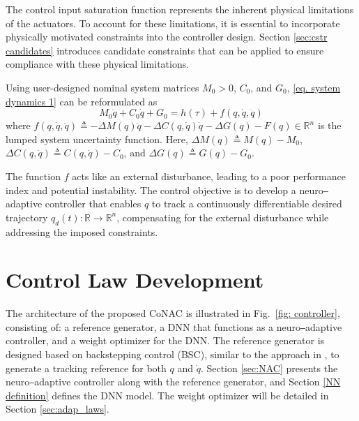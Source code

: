 \documentclass[lettersize,journal]{IEEEtran}
\begin{document}
The control input saturation function represents the inherent physical limitations of the actuators. To account for these limitations, it is essential to incorporate physically motivated constraints into the controller design. Section \ref{sec:cstr candidates} introduces candidate constraints that can be applied to ensure compliance with these physical limitations.

Using user-designed nominal system matrices $M_0 > 0$, $C_0$, and $G_0$, \eqref{eq. system dynamics 1} can be reformulated as
\begin{equation}
    M_0\ddot q+C_0\dot q+G_0 = h(\tau) + f(q,\dot q,\ddot q)
    \label{eq. system dynamics 2}
\end{equation}
where $f(q,\dot q,\ddot q) \triangleq -\Delta M(q)\ddot q-\Delta C(q,\dot q)\dot q -\Delta G(q) -F(q)\in\mathbb{R}^n$ is the lumped system uncertainty function. Here, $\Delta M(q)\triangleq M(q)-M_0$, $\Delta C(q,\dot q)\triangleq C(q,\dot q)-C_0$, and $\Delta G(q)\triangleq G(q)-G_0$. 

The function $f$ acts like an external disturbance, leading to a poor performance index and potential instability. 
The control objective is to develop a neuro‒adaptive controller that enables $q$ to track a continuously differentiable desired trajectory ${q_d}(t): \mathbb{R} \to \mathbb{R}^n$, compensating for the external disturbance while addressing the imposed constraints.

\section{Control Law Development}\label{sec:ctrl design}

The architecture of the proposed CoNAC is illustrated in Fig.~\ref{fig: controller}, consisting of: a reference generator, a DNN that functions as a neuro‒adaptive controller, and a weight optimizer for the DNN. 
The reference generator is designed based on backstepping control (BSC), similar to the approach in \cite{RN20}, to generate a tracking reference for both $q$ and $\dot q$.
Section \ref{sec:NAC} presents the neuro‒adaptive controller along with the reference generator, and Section \ref{NN definition} defines the DNN model. The weight optimizer will be detailed in Section \ref{sec:adap_laws}.
\end{document}
